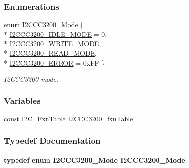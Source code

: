 \subsubsection*{Enumerations}
\begin{DoxyCompactItemize}
\item 
enum \hyperlink{_i2_c_c_c3200_8h_aecba715487712a8b525074b7b93e940b}{I2\+C\+C\+C3200\+\_\+\+Mode} \{ \\*
\hyperlink{_i2_c_c_c3200_8h_aecba715487712a8b525074b7b93e940ba39c02bbdf27eb3022e79e392d3f08648}{I2\+C\+C\+C3200\+\_\+\+I\+D\+L\+E\+\_\+\+M\+O\+D\+E} = 0, 
\\*
\hyperlink{_i2_c_c_c3200_8h_aecba715487712a8b525074b7b93e940ba9c614218d1b85c03c650df65996bd87a}{I2\+C\+C\+C3200\+\_\+\+W\+R\+I\+T\+E\+\_\+\+M\+O\+D\+E}, 
\\*
\hyperlink{_i2_c_c_c3200_8h_aecba715487712a8b525074b7b93e940ba592d1ad3d4ebb76ae41697215dab7943}{I2\+C\+C\+C3200\+\_\+\+R\+E\+A\+D\+\_\+\+M\+O\+D\+E}, 
\\*
\hyperlink{_i2_c_c_c3200_8h_aecba715487712a8b525074b7b93e940ba7dc2951d6837d16501d116c501ae8e05}{I2\+C\+C\+C3200\+\_\+\+E\+R\+R\+O\+R} = 0x\+F\+F
 \}
\begin{DoxyCompactList}\small\item\em I2\+C\+C\+C3200 mode. \end{DoxyCompactList}\end{DoxyCompactItemize}
\subsubsection*{Variables}
\begin{DoxyCompactItemize}
\item 
const \hyperlink{struct_i2_c___fxn_table}{I2\+C\+\_\+\+Fxn\+Table} \hyperlink{_i2_c_c_c3200_8h_a8d55c316465052f05df19d16002be53a}{I2\+C\+C\+C3200\+\_\+fxn\+Table}
\end{DoxyCompactItemize}


\subsubsection{Typedef Documentation}
\paragraph[{I2\+C\+C\+C3200\+\_\+\+Mode}]{\setlength{\rightskip}{0pt plus 5cm}typedef enum {\bf I2\+C\+C\+C3200\+\_\+\+Mode}  {\bf I2\+C\+C\+C3200\+\_\+\+Mode}}\label{_i2_c_c_c3200_8h_a3e7a8af39ebe4372d43cbcbd760e5ab6}


